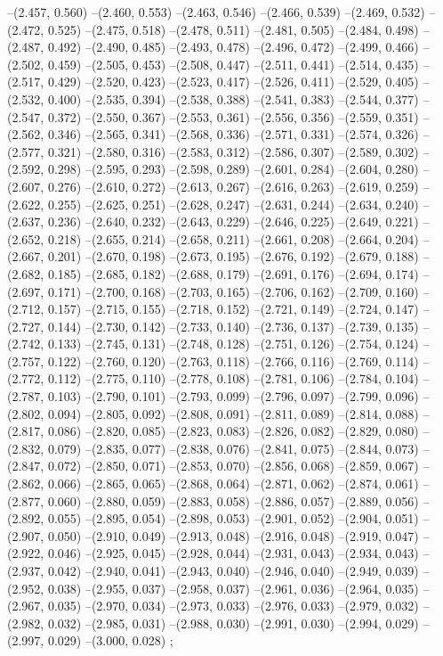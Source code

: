 --(2.457, 0.560)
--(2.460, 0.553)
--(2.463, 0.546)
--(2.466, 0.539)
--(2.469, 0.532)
--(2.472, 0.525)
--(2.475, 0.518)
--(2.478, 0.511)
--(2.481, 0.505)
--(2.484, 0.498)
--(2.487, 0.492)
--(2.490, 0.485)
--(2.493, 0.478)
--(2.496, 0.472)
--(2.499, 0.466)
--(2.502, 0.459)
--(2.505, 0.453)
--(2.508, 0.447)
--(2.511, 0.441)
--(2.514, 0.435)
--(2.517, 0.429)
--(2.520, 0.423)
--(2.523, 0.417)
--(2.526, 0.411)
--(2.529, 0.405)
--(2.532, 0.400)
--(2.535, 0.394)
--(2.538, 0.388)
--(2.541, 0.383)
--(2.544, 0.377)
--(2.547, 0.372)
--(2.550, 0.367)
--(2.553, 0.361)
--(2.556, 0.356)
--(2.559, 0.351)
--(2.562, 0.346)
--(2.565, 0.341)
--(2.568, 0.336)
--(2.571, 0.331)
--(2.574, 0.326)
--(2.577, 0.321)
--(2.580, 0.316)
--(2.583, 0.312)
--(2.586, 0.307)
--(2.589, 0.302)
--(2.592, 0.298)
--(2.595, 0.293)
--(2.598, 0.289)
--(2.601, 0.284)
--(2.604, 0.280)
--(2.607, 0.276)
--(2.610, 0.272)
--(2.613, 0.267)
--(2.616, 0.263)
--(2.619, 0.259)
--(2.622, 0.255)
--(2.625, 0.251)
--(2.628, 0.247)
--(2.631, 0.244)
--(2.634, 0.240)
--(2.637, 0.236)
--(2.640, 0.232)
--(2.643, 0.229)
--(2.646, 0.225)
--(2.649, 0.221)
--(2.652, 0.218)
--(2.655, 0.214)
--(2.658, 0.211)
--(2.661, 0.208)
--(2.664, 0.204)
--(2.667, 0.201)
--(2.670, 0.198)
--(2.673, 0.195)
--(2.676, 0.192)
--(2.679, 0.188)
--(2.682, 0.185)
--(2.685, 0.182)
--(2.688, 0.179)
--(2.691, 0.176)
--(2.694, 0.174)
--(2.697, 0.171)
--(2.700, 0.168)
--(2.703, 0.165)
--(2.706, 0.162)
--(2.709, 0.160)
--(2.712, 0.157)
--(2.715, 0.155)
--(2.718, 0.152)
--(2.721, 0.149)
--(2.724, 0.147)
--(2.727, 0.144)
--(2.730, 0.142)
--(2.733, 0.140)
--(2.736, 0.137)
--(2.739, 0.135)
--(2.742, 0.133)
--(2.745, 0.131)
--(2.748, 0.128)
--(2.751, 0.126)
--(2.754, 0.124)
--(2.757, 0.122)
--(2.760, 0.120)
--(2.763, 0.118)
--(2.766, 0.116)
--(2.769, 0.114)
--(2.772, 0.112)
--(2.775, 0.110)
--(2.778, 0.108)
--(2.781, 0.106)
--(2.784, 0.104)
--(2.787, 0.103)
--(2.790, 0.101)
--(2.793, 0.099)
--(2.796, 0.097)
--(2.799, 0.096)
--(2.802, 0.094)
--(2.805, 0.092)
--(2.808, 0.091)
--(2.811, 0.089)
--(2.814, 0.088)
--(2.817, 0.086)
--(2.820, 0.085)
--(2.823, 0.083)
--(2.826, 0.082)
--(2.829, 0.080)
--(2.832, 0.079)
--(2.835, 0.077)
--(2.838, 0.076)
--(2.841, 0.075)
--(2.844, 0.073)
--(2.847, 0.072)
--(2.850, 0.071)
--(2.853, 0.070)
--(2.856, 0.068)
--(2.859, 0.067)
--(2.862, 0.066)
--(2.865, 0.065)
--(2.868, 0.064)
--(2.871, 0.062)
--(2.874, 0.061)
--(2.877, 0.060)
--(2.880, 0.059)
--(2.883, 0.058)
--(2.886, 0.057)
--(2.889, 0.056)
--(2.892, 0.055)
--(2.895, 0.054)
--(2.898, 0.053)
--(2.901, 0.052)
--(2.904, 0.051)
--(2.907, 0.050)
--(2.910, 0.049)
--(2.913, 0.048)
--(2.916, 0.048)
--(2.919, 0.047)
--(2.922, 0.046)
--(2.925, 0.045)
--(2.928, 0.044)
--(2.931, 0.043)
--(2.934, 0.043)
--(2.937, 0.042)
--(2.940, 0.041)
--(2.943, 0.040)
--(2.946, 0.040)
--(2.949, 0.039)
--(2.952, 0.038)
--(2.955, 0.037)
--(2.958, 0.037)
--(2.961, 0.036)
--(2.964, 0.035)
--(2.967, 0.035)
--(2.970, 0.034)
--(2.973, 0.033)
--(2.976, 0.033)
--(2.979, 0.032)
--(2.982, 0.032)
--(2.985, 0.031)
--(2.988, 0.030)
--(2.991, 0.030)
--(2.994, 0.029)
--(2.997, 0.029)
--(3.000, 0.028)
;
